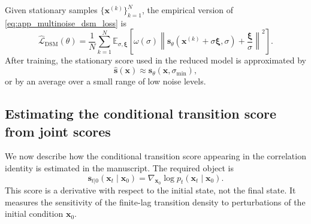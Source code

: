 \documentclass[11pt,twoside,fleqn]{article}
\begin{document}
Given stationary samples $\{\bm{x}^{(k)}\}_{k=1}^N$, the empirical version of \eqref{eq:app_multinoise_dsm_loss} is
\begin{equation}
    \widehat{\mathcal{L}}_{\mathrm{DSM}}(\theta)
    =
    \frac{1}{N}
    \sum_{k=1}^N
    \mathbb{E}_{\sigma,\bm{\xi}}
    \left[
        \omega(\sigma)
        \left\|
            \bm{s}_\theta(\bm{x}^{(k)}+\sigma\bm{\xi},\sigma)
            +
            \frac{\bm{\xi}}{\sigma}
        \right\|^2
    \right].
    \label{eq:app_empirical_stationary_dsm}
\end{equation}
After training, the stationary score used in the reduced model is approximated by
\begin{equation}
    \widehat{\bm{s}}(\bm{x})
    \approx
    \bm{s}_\theta(\bm{x},\sigma_{\min}),
    \label{eq:app_stationary_score_estimator}
\end{equation}
or by an average over a small range of low noise levels.

\subsection{Estimating the conditional transition score from joint scores}
\label{app:conditional_score_dsm}

We now describe how the conditional transition score appearing in the
correlation identity is estimated in the manuscript. The required object is
\begin{equation}
    \bm{s}_{t|0}(\bm{x}_t\mid\bm{x}_0)
    =
    \nabla_{\bm{x}_0}
    \log p_t(\bm{x}_t\mid\bm{x}_0).
    \label{eq:app_transition_score_def}
\end{equation}
This score is a derivative with respect to the initial state, not the final
state. It measures the sensitivity of the finite-lag transition density to
perturbations of the initial condition $\bm{x}_0$.
\end{document}
